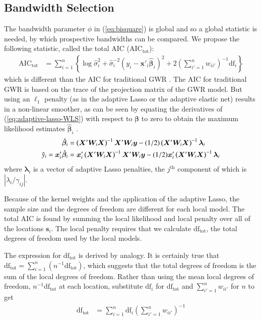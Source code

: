 \documentclass[authoryear, review, 11pt]{elsarticle}
\begin{document}
	\subsection{Bandwidth Selection}
	The bandwidth parameter $\phi$ in (\ref{eq:bisquare}) is global and so a global statistic is needed, by which prospective bandwidths can be compared. We propose the following statistic, called the total AIC ($\mbox{AIC}_{\text{tot}}$):
	\begin{align}\label{eq:total-AIC}
		\mbox{AIC}_{\mbox{tot}} &= \sum_{i=1}^n \left\{ \log \hat{\sigma}_i^2 + \hat{\sigma}_i^{-2} \left(y_i - \bm{x}'_i \hat{\bm{\beta}}_i \right)^2 + 2 \left(\sum_{i'=1}^n w_{ii'} \right)^{-1} \mbox{df}_i \right\}
	\end{align}	
	which is different than the AIC for traditional GWR \citep{Fotheringham:2002}. The AIC for traditional GWR is based on the trace of the projection matrix of the GWR model. But using an $\ell_1$ penalty (as in the adaptive Lasso or the adaptive elastic net) results in a non-linear smoother, as can be seen by equating the derivatives of (\ref{eq:adaptive-lasso-WLS}) with respect to $\bm{\beta}$ to zero to obtain the maximum likelihood estimates $\hat{\bm{\beta}}_i$ \citep{Zou:2007}.
	\begin{align}
		\hat{\bm{\beta}}_i &= \left( \bm{X}'\bm{W}_i\bm{X} \right)^{-1}  \bm{X}'\bm{W}_i\bm{y}  - (1/2) \left(\bm{X}'\bm{W}_i\bm{X} \right)^{-1} \bm{\lambda}_i \notag \\
		\hat{y}_i = \bm{x}_i' \hat{\bm{\beta}}_i &=  \bm{x}_i' \left( \bm{X}'\bm{W}_i\bm{X} \right)^{-1}  \bm{X}'\bm{W}_i\bm{y}  - (1/2) \bm{x}_i' \left(\bm{X}'\bm{W}_i\bm{X} \right)^{-1} \bm{\lambda}_i \notag
	\end{align}
	where $\bm{\lambda}_i$ is a vector of adaptive Lasso penalties, the $j^{\text{th}}$ component of which is $|\lambda_i / \gamma_{ij}|$.
	
	Because of the kernel weights and the application of the adaptive Lasso, the sample size and the degrees of freedom are different for each local model. The total AIC is found by summing the local likelihood and local penalty over all of the locations $\bm{s}_i$. The local penalty requires that we calculate $\text{df}_{\text{tot}}$, the total degrees of freedom used by the local models.
	
	The expression for $\text{df}_{\text{tot}}$ is derived by analogy. It is certainly true that $\text{df}_{\text{tot}} = \sum\limits_{i=1}^n \left( n^{-1} \text{df}_{\text{tot}} \right)$, which suggests that the total degrees of freedom is the sum of the local degrees of freedom. Rather than using the mean local degrees of freedom, $n^{-1} \text{df}_{\text{tot}}$ at each location, substitute $\text{df}_i$ for $\text{df}_{\text{tot}}$ and $\sum\limits_{i'=1}^n w_{ii'}$ for $n$ to get 
	\begin{align}
		\text{df}_{\text{tot}} &= \sum\limits_{i=1}^n \text{df}_i  \left( \sum\limits_{i'=1}^n w_{ii'} \right)^{-1}
	\end{align}
\end{document}
